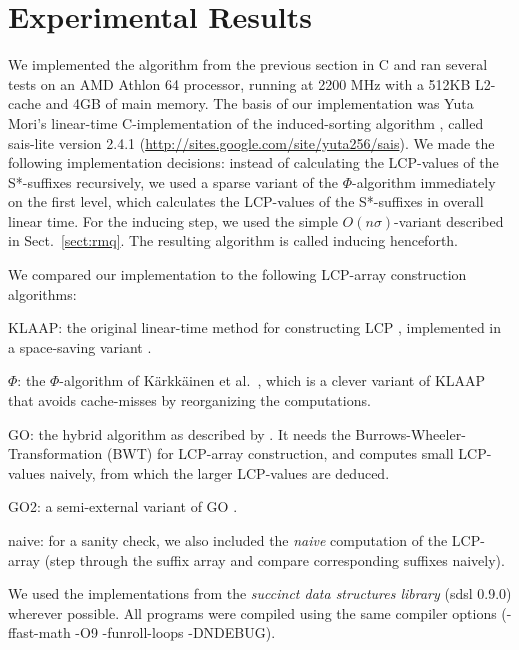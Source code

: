 \documentclass[11pt,onecolumn,final]{article} \usepackage[latin1]{inputenc}
\theoremstyle{plain}
\theoremstyle{remark}
\begin{document}
\section{Experimental Results}
\label{sect:practical}
We implemented the algorithm from the previous section in C and ran several tests on an AMD Athlon 64 processor, running at 2200 MHz with a 512KB L2-cache and 4GB of main memory. The basis of our implementation was Yuta Mori's linear-time C-implementation of the induced-sorting algorithm \cite{nong09linear}, called \textsf{sais-lite} version 2.4.1 (\url{http://sites.google.com/site/yuta256/sais}). We made the following implementation decisions: instead of calculating the LCP-values of the S*-suffixes recursively, we used a sparse variant of the $\Phi$-algorithm \cite{kaerkkaeinen09permuted} immediately on the first level, which calculates the LCP-values of the S*-suffixes in overall linear time. For the inducing step, we used the simple $O(n\sigma)$-variant described in Sect.~\ref{sect:rmq}. The resulting algorithm is called \textsf{inducing} henceforth.

We compared our implementation to the following LCP-array construction algorithms:
\begin{description}
\item \textsf{KLAAP}: the original linear-time method for constructing LCP \cite{kasai01linear}, implemented in a space-saving variant \cite{manzini04two}.
\item $\Phi$: the $\Phi$-algorithm of K\"arkk\"ainen et al.~\cite{kaerkkaeinen09permuted}, which is a clever variant of \textsf{KLAAP} that avoids cache-misses by reorganizing the computations.
\item \textsf{GO}: the hybrid algorithm as described by \cite{gog11fast}. It needs the Burrows-Wheeler-Transformation (BWT) for LCP-array construction, and computes small LCP-values naively, from which the larger LCP-values are deduced.
\item \textsf{GO2}: a semi-external variant of \textsf{GO} \cite{gog11fast}.
\item \textsf{naive}: for a sanity check, we also included the \emph{naive} computation of the LCP-array (step through the suffix array and compare corresponding suffixes naively).
\end{description}
We used the implementations from the \emph{succinct data structures library} (sdsl 0.9.0) \cite{gog11fast} wherever possible. All programs were compiled using the same compiler options (-ffast-math -O9 -funroll-loops -DNDEBUG).
\end{document}
